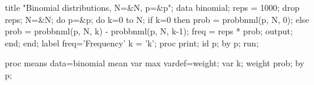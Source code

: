 \begin{listing}
title "Binomial distributions, N=&N, p=&p";
data binomial;
   reps = 1000;
   drop reps;
   N=&N;
   do p=&p;
      do k=0 to N;
         if k=0 
            then prob = probbnml(p, N, 0);
            else prob = probbnml(p, N, k) - probbnml(p, N, k-1);
         freq = reps * prob;
         output;
         end;
      end;
   label freq='Frequency'
      k = 'k';
proc print;
   id p;
   by p;
run;

proc means data=binomial mean var max vardef=weight;
   var k;
   weight prob;
   by p;
\end{listing}
